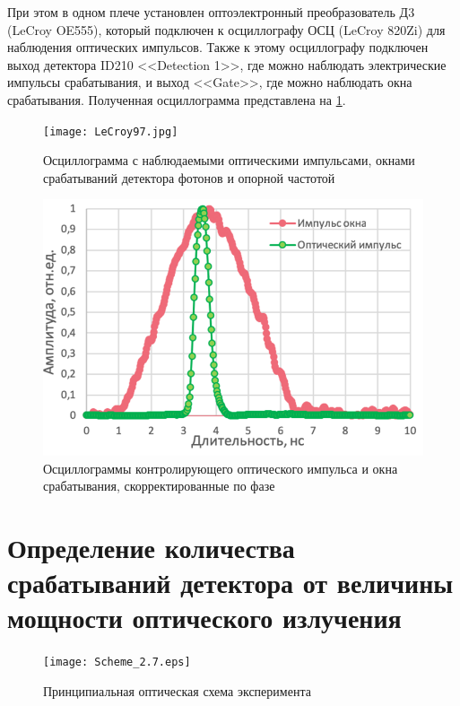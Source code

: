 При этом в одном плече установлен оптоэлектронный преобразователь Д3 (LeCroy OE555), который подключен к осциллографу ОСЦ (LeCroy 820Zi) для наблюдения оптических импульсов. Также к этому осциллографу подключен выход детектора ID210 <<Detection 1>>, где можно наблюдать электрические импульсы срабатывания, и выход <<Gate>>, где можно наблюдать окна срабатывания. Полученная осциллограмма представлена на \ref{fig:LeCroy}. 

 \begin{figure}[ht]
  \centering
  \texttt{[image: LeCroy97.jpg]}
  \caption{Осциллограмма с наблюдаемыми оптическими импульсами, окнами срабатываний детектора фотонов и опорной частотой}
  \label{fig:LeCroy}
\end{figure}



 \begin{figure}[ht]
  \centering
  \includegraphics{images/optical pulse and gate.png}
  \caption{Осциллограммы контролирующего оптического импульса и окна срабатывания, скорректированные по фазе}
  \label{fig:optical_pulse_and_gate}
\end{figure}


\pagebreak


\section{Определение количества срабатываний детектора от величины мощности оптического излучения} \label{sec:ch2/sec7}


 \begin{figure}[ht]
  \centering
  \texttt{[image: Scheme\_2.7.eps]}
  \caption{Принципиальная оптическая схема эксперимента}
  \label{fig:Scheme_2.7}
\end{figure}


